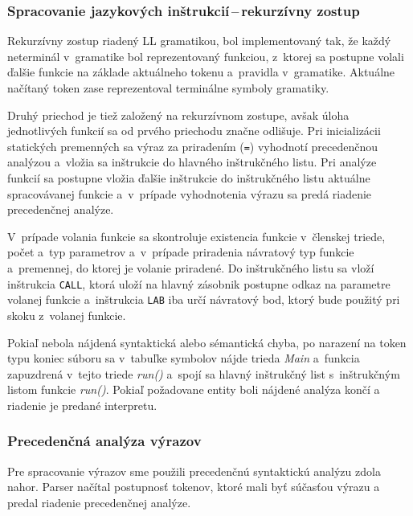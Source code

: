 \documentclass[11pt,a4paper]{article}
\begin{document}
        \subsubsection{Spracovanie jazykových inštrukcií\,--\,rekurzívny zostup}
        \label{rekurzia}
        Rekurzívny zostup riadený LL gramatikou, bol implementovaný tak, že každý
        neterminál v~gramatike bol reprezentovaný funkciou, z~ktorej sa postupne
        volali ďalšie funkcie na základe aktuálneho tokenu a~pravidla v~gramatike.
        Aktuálne načítaný token zase reprezentoval terminálne symboly gramatiky.

        Druhý priechod je tiež založený na rekurzívnom zostupe, avšak úloha
        jednotlivých funkcií sa od prvého priechodu značne odlišuje.
        Pri inicializácii statických premenných sa výraz za priradením (\texttt{=})
        vyhodnotí precedenčnou analýzou a~vložia sa inštrukcie do hlavného
        inštrukčného listu. Pri analýze funkcií sa postupne vložia ďalšie inštrukcie
        do inštrukčného listu aktuálne spracovávanej funkcie a~v~prípade vyhodnotenia
        výrazu  sa predá riadenie precedenčnej analýze.

        V~prípade volania funkcie sa skontroluje existencia funkcie v~členskej
        triede, počet a~typ parametrov a~v~prípade priradenia  návratový typ
        funkcie a~premennej, do ktorej je volanie priradené. Do inštrukčného
        listu sa vloží inštrukcia \texttt{CALL}, ktorá uloží na hlavný zásobnik
        postupne odkaz na parametre volanej funkcie a~inštrukcia \texttt{LAB}
        iba určí návratový bod, ktorý bude použitý pri skoku z~volanej funkcie.

        Pokiaľ nebola nájdená syntaktická alebo sémantická chyba, po narazení na
        token typu koniec súboru sa v~tabuľke symbolov nájde trieda \emph{Main}
        a~funkcia zapuzdrená v~tejto triede \emph{run()} a~spojí sa hlavný inštrukčný
        list s~inštrukčným listom funkcie \emph{run()}. Pokiaľ požadovane entity
        boli nájdené analýza končí a riadenie je predané interpretu.

        \subsubsection{Precedenčná analýza výrazov}
        \label{precedencna analyza}

        Pre spracovanie výrazov sme použili precedenčnú syntaktickú analýzu zdola nahor.
        Parser načítal postupnosť tokenov, ktoré mali byť súčasťou výrazu a predal
        riadenie precedenčnej analýze.
\end{document}

